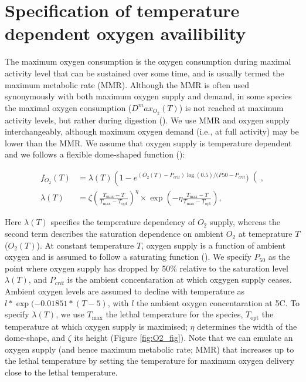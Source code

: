 \documentclass[a4paper, toc=index,abstract=true]{scrartcl}\usepackage[]{graphicx}\usepackage[]{color}
\begin{document}
\printbibliography 

\appendix

\section{Specification of temperature dependent oxygen availibility}

The maximum oxygen consumption is the oxygen consumption during maximal activity level that can be sustained over some time, and is usually termed the maximum metabolic rate (MMR). Although the MMR is often used synonymously with both maximum oxygen supply and demand, in some species the maximal oxygen consumption ($D^max_{O_2}(T)$) is not reached at maximum activity levels, but rather during digestion (\cite{priede_metabolic_1985}). We use MMR and oxygen supply interchangeably, although maximum oxygen demand (i.e., at full activity) may be lower than the MMR. We assume that oxygen supply is temperature dependent and we follows a flexible dome-shaped function (\cite{gnauck2013freshwater, lefrancois_influence_2003}):

\begin{align}
f_{O_2}(T)&=\lambda(T)\left(1-e^{(O_2(T)-P_{crit})\log(0.5)/(P50-P_{crit}})\right(,\\
\lambda(T)&=\zeta(\frac{T_{\text{max}}-T}{T_{\text{max}}-T_{\text{opt}}})^\eta \times \exp(-\eta\frac{T_{\text{max}}-T}{T_{\text{max}}-T_{\text{opt}}}),
\end{align}

Here $\lambda(T)$ specifies the temperature dependency of $O_2$ supply, whereas the second term describes the saturation dependence on ambient $O_2$ at temeprature $T$ ($O_2(T)$). At constant temperature $T$, oxygen supply is a function of ambient oxygen and is assumed to follow a saturating function (\cite[e.g.,][]{lefrancois_influence_2003}). We specify $P_{50}$ as the point where oxygen supply has dropped by 50\% relative to the saturation level $\lambda(T)$, and $P_{crit}$ is the ambient concentaration at which oxgygen supply ceases. Ambient oxygen levels are assumed to decline with temperature as $l*\exp(-0.01851*(T-5)$, with $l$ the ambient oxygen concentaration at 5\degree C. To specify $\lambda(T)$, we use $T_{\text{max}}$ the lethal temperature for the species, $T_{\text{opt}}$ the temperature at which oxygen supply is maximised; $\eta$ determines the width of the dome-shape, and $\zeta$ its height (Figure \ref{fig:O2_fig}). Note that we can emulate an oxygen supply (and hence maximum metabolic rate; MMR) that increases up to the lethal temperature by setting the temperature for maximum oxygen delivery close to the lethal temperature.
\end{document}
